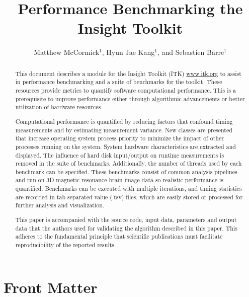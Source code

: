 \documentclass{InsightArticle}
\title{Performance Benchmarking the Insight Toolkit}
\author{Matthew McCormick$^{1}$, Hyun Jae Kang$^{1}$, and Sebastien Barre$^{1}$}
\newcommand{\IJhandlerIDnumber}{1338}
\begin{document}
%
%
\IJhandlefooter{\IJhandlerIDnumber}


\ifpdf
\else
\fi


\maketitle


\ifhtml
\chapter*{Front Matter\label{front}}
\fi

\begin{abstract} \noindent This document describes a module for the Insight
Toolkit (ITK) \url{www.itk.org} to assist in performance benchmarking and a
suite of benchmarks for the toolkit. These resources provide metrics to
quantify software computational performance. This is a prerequisite to
improve performance either through algorithmic advancements or better
utilization of hardware resources.

Computational performance is quantified by reducing factors that confound timing
measurements and by estimating measurement variance. New classes are presented
that increase operating system process priority to minimize the impact of
other processes running on the system. System hardware characteristics are
extracted and displayed. The influence of hard disk input/output on runtime
measurements is removed in the suite of benchmarks. Additionally, the number
of threads used by each benchmark can be specified. These benchmarks consist
of common analysis pipelines and run on 3D magnetic resonance brain image data
so realistic performance is quantified. Benchmarks can be executed with
multiple iterations, and timing statistics are recorded in tab separated value
(.tsv) files, which are easily stored or processed for further analysis and
visualization.

This paper is accompanied with the source code, input data, parameters and
output data that the authors used for validating the algorithm described in
this paper. This adheres to the fundamental principle that scientific
publications must facilitate reproducibility of the reported results.

\end{abstract}
\end{document}
